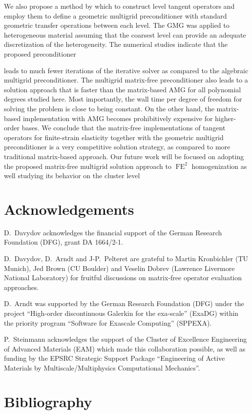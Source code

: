 \documentclass[times,doublespace]{nmeauth}
\newcommand{\changeDD}[1]{#1}
\newcommand{\changeJP}[1]{#1}
\begin{document}
\changeDD{
We also propose a method by which to construct level tangent operators and employ them to define a geometric multigrid preconditioner}
with standard geometric transfer operations between each level.
The GMG was applied to heterogeneous material assuming that the coarsest level can provide an adequate discretization of the heterogeneity.
The numerical studies indicate that the proposed preconditioner
\changeDD{
leads to much fewer iterations of the iterative solver as compared to the algebraic multigrid preconditioner.
The multigrid matrix-free preconditioner also}
leads to a solution approach that is faster than the matrix-based AMG \changeDD{for all polynomial degrees studied here.
Most importantly, the wall time per degree of freedom for solving the problem is close to being constant.
On the other hand, the matrix-based implementation with AMG becomes prohibitively expensive for higher-order bases.
We conclude that the matrix-free implementations of tangent operators for finite-strain elasticity together with
the geometric multigrid preconditioner is a very competitive solution strategy, as compared to more traditional matrix-based approach.
Our future work will be focused on adopting the proposed matrix-free multigrid solution approach to $\operatorname{FE}^2$ homogenization
as well studying its behavior on the cluster level
}

\ifijnme
\acks
\else
\section*{Acknowledgements}
\fi

D.~Davydov acknowledges the financial support of the German Research Foundation (DFG), grant DA 1664/2-1.

D.~Davydov, D.~Arndt and J-P.~Pelteret are grateful to \changeDD{Martin Kronbichler (TU Munich),} Jed Brown (CU Boulder) and Veselin Dobrev (Lawrence Livermore National Laboratory) for \changeJP{fruitful discussions} on matrix-free operator evaluation approaches.

D.~Arndt was supported by the German Research Foundation (DFG) under the project ``High-order discontinuous
Galerkin for the exa-scale'' (\mbox{ExaDG}) within the priority program ``Software
for Exascale Computing'' (SPPEXA).


P.~Steinmann acknowledges the support of the Cluster of Excellence Engineering of Advanced Materials (EAM) which made this collaboration possible, as well as funding by the EPSRC Strategic Support Package ``Engineering of Active Materials by Multiscale/Multiphysics Computational Mechanics''.


\ifijnme

\else
\section*{Bibliography}

\fi


\end{document}
